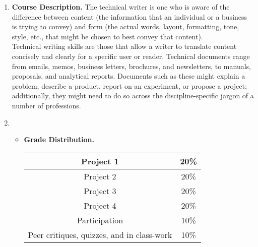 \documentclass[9pt]{article}
\begin{document}
\begin{enumerate}
\renewcommand{\labelenumi}{(\Roman{enumi})}
   \item \textbf{Course Description.} The technical writer is one who is aware
         of the difference between content (the information that an individual
         or a business is trying to convey) and form (the actual words, layout,
         formatting, tone, style, etc., that might be chosen to best convey that
         content). \\
         
         Technical writing skills are those that allow a writer to translate
         content concisely and clearly for a specific user or reader. Technical
         documents range from emails, memos, business letters, brochures, and
         newsletters, to manuals, proposals, and analytical reports. Documents
         such as these might explain a problem, describe a product, report on
         an experiment, or propose a project; additionally, they might need to
         do so across the discipline-specific jargon of a number of professions.
         
   \item \begin{itemize}
            \item \textbf{Grade Distribution.}
         \begin{center}
            \begin{tabular}{@{}|c|c|@{}}
               \hline Project 1 & 20\% \\ \hline
               Project 2 & 20\% \\ \hline
               Project 3 & 20\% \\ \hline
               Project 4 & 20\% \\ \hline
               Participation & 10\% \\ \hline
               Peer critiques, quizzes, and in class-work & 10\% \\ \hline
            \end{tabular}
         \end{center}
         

\end{itemize}
\end{enumerate}
\end{document}
